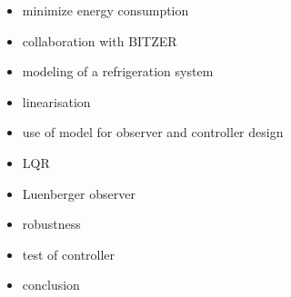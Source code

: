 


\begin{itemize}
	\item minimize energy consumption
	\item collaboration with BITZER
	\item modeling of a refrigeration system
	\item linearisation
	\item use of model for observer and controller design
	\item LQR
	\item Luenberger observer
	\item robustness
	\item test of controller
	\item conclusion
\end{itemize}
